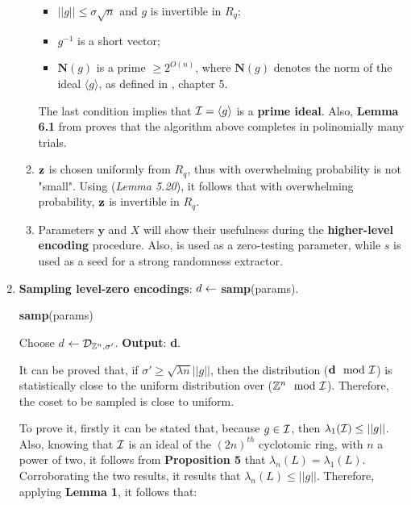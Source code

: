\begin{enumerate}[label=(\alph*)]
\begin{enumerate}[label=\arabic*:]
		\begin{itemize}
			\item $||g|| \leq \sigma \sqrt{n}$ and $g$ is invertible in $R_q$;
			\item $g^{-1}$ is a short vector;
			\item $\textbf{N}(g)$ is a prime $\geq 2^{O(n)}$, where $\textbf{N}(g)$ denotes the norm of the ideal $\langle g \rangle$, as defined in \cite{Gar15}, chapter 5.
		\end{itemize}
		
		The last condition implies that $\mathcal{I} = \langle g \rangle$ is a \textbf{prime ideal}. Also, \textbf{Lemma 6.1} from \cite{Gar15} proves that the algorithm above completes in polinomially many trials.
		
		
		\item $\textbf{z}$ is chosen uniformly from $R_q$, thus with overwhelming probability is not "small". Using \cite{Gar15} (\textit{Lemma 5.20}), it follows that with overwhelming probability, $\textbf{z}$ is invertible in $R_q$.
		
		\item Parameters $\textbf{y}$ and $X$ will show their usefulness during the \textbf{higher-level encoding} procedure. Also, {\pzt} is used as a zero-testing parameter, while $s$ is used as a seed for a strong randomness extractor.
	\end{enumerate}



\item \textbf{Sampling level-zero encodings}: $d \leftarrow$ \textbf{samp}(params).

	\begin{tcolorbox}[colframe=black,colback=white,arc=0pt,outer arc=0pt]
	\begin{center}
		\textbf{samp}(params)
	\end{center}
	\begin{algorithmic}[1]
		\State Choose \textbf{$d$} $\leftarrow \mathcal{D}_{{\mathbb Z}^n, \sigma'}$.
		\Statex
		\State \textbf{Output}: \textbf{d}.
	\end{algorithmic}
\end{tcolorbox}

	It can be proved that, if $\sigma' \geq \sqrt{\lambda n}||g||$, then the distribution ($\textbf{d}\mod{\mathcal{I}}$) is statistically close to the uniform distribution over (${\mathbb Z}^n \mod {\mathcal{I}}$). Therefore, the coset to be sampled is close to uniform.
	
	To prove it, firstly it can be stated that, because $g \in \mathcal{I}$, then $\lambda_1(\mathcal{I}) \leq ||g||$. Also, knowing that $\mathcal{I}$ is an ideal of the $(2n)^{th}$ cyclotomic ring, with $n$ a power of two, it follows from \textbf{Proposition 5} that $\lambda_n(L) = \lambda_1(L)$. Corroborating the two results, it results that $\lambda_n(L)\leq ||g||$. Therefore, applying \textbf{Lemma 1}, it follows that:
	

\end{enumerate}
